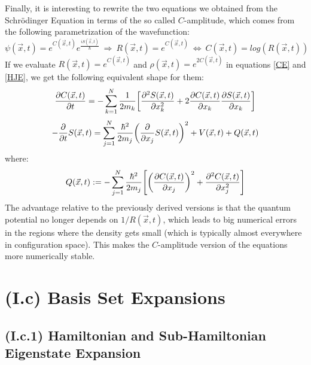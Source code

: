 \documentclass[11pt, a4paper]{article} %
\begin{document}
Finally, it is interesting to rewrite the two equations we obtained from the Schrödinger Equation in terms of the so called $C$-amplitude, which comes from the following parametrization of the wavefunction:
\begin{equation}
\psi(\vec{x},t)=e^{C(\vec{x},t)}e^{\frac{iS(\vec{x},t)}{\hbar}}\ \Longrightarrow\ R(\vec{x},t)=e^{C(\vec{x},t)} \ \Leftrightarrow \ C(\vec{x},t)=log(R(\vec{x},t))
\end{equation}
If we evaluate $R(\vec{x},t)=e^{C(\vec{x},t)}$ and $\rho(\vec{x},t)=e^{2C(\vec{x},t)}$ in equations \eqref{CE} and \eqref{HJE}, we get the following equivalent shape for them:
\begin{equation}\label{CE.C}
\pdv{C(\vec{x},t)}{t} = -\sum_{k=1}^N \frac{1}{2m_k}\qty[\pdv[2]{S(\vec{x},t)}{x_k}+2\pdv{C(\vec{x},t)}{x_k}\pdv{S(\vec{x},t)}{x_k}]
\end{equation}
\begin{equation}\label{HJE.C}
-\pdv{}{t}S(\vec{x},t) = \sum_{j=1}^N \frac{\hbar^2}{2m_j} \qty(\pdv{}{x_j} S(\vec{x},t) )^2+ V(\vec{x},t)+Q(\vec{x},t)
\end{equation}
where:
\begin{equation}\label{QP.C}
Q(\vec{x},t):=-\sum_{j=1}^N \frac{\hbar^2}{2m_j}\qty[\qty(\pdv{C(\vec{x},t)}{x_j})^2+\pdv[2]{C(\vec{x},t)}{x_j}]
\end{equation}
The advantage relative to the previously derived versions is that the quantum potential no longer depends on $1/R(\vec{x},t)$, which leads to big numerical errors in the regions where the density gets small (which is typically almost everywhere in configuration space). This makes the $C$-amplitude version of the equations more numerically stable.
\newpage
\section*{(I.c) Basis Set Expansions}
\vspace{-0.4cm}
\subsection*{(I.c.1) Hamiltonian and Sub-Hamiltonian Eigenstate Expansion\vspace{-0.25cm}}
\end{document}
